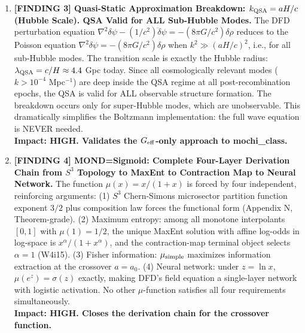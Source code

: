 \documentclass[11pt]{article}
\theoremstyle{definition}
\theoremstyle{remark}
\newcommand{\Geff}{G_{\rm eff}}
\newcommand{\dpsi}{\delta\psi}
\begin{document}
\begin{tcolorbox}[colback=blue!5!white, colframe=blue!60!black,
  title=\textbf{W4i19 TOP 5 FINDINGS --- RANKED BY IMPACT}]
\begin{enumerate}[nosep]
\item \textbf{[FINDING 3] Quasi-Static Approximation Breakdown:
  $k_{\rm QSA} = aH/c$ (Hubble Scale). QSA Valid for ALL Sub-Hubble Modes.}
  The DFD perturbation equation $\nabla^2\dpsi - (1/c^2)\ddot\dpsi
  = -(8\pi G/c^2)\delta\rho$ reduces to the Poisson equation
  $\nabla^2\dpsi = -(8\pi G/c^2)\delta\rho$ when $k^2 \gg (aH/c)^2$,
  i.e., for all sub-Hubble modes. The transition scale is exactly the
  Hubble radius: $\lambda_{\rm QSA} = c/H \approx 4.4$ Gpc today.
  Since all cosmologically relevant modes ($k > 10^{-4}$ Mpc$^{-1}$)
  are deep inside the QSA regime at all post-recombination epochs,
  the QSA is valid for ALL observable structure formation.
  The breakdown occurs only for super-Hubble modes, which are
  unobservable. This dramatically simplifies the Boltzmann
  implementation: the full wave equation is NEVER needed.\\
  \textbf{Impact: HIGH. Validates the $\Geff$-only approach to mochi\_class.}

\item \textbf{[FINDING 4] MOND=Sigmoid: Complete Four-Layer Derivation Chain
  from $S^3$ Topology to MaxEnt to Contraction Map to Neural Network.}
  The function $\mu(x) = x/(1+x)$ is forced by four independent,
  reinforcing arguments: (1) $S^3$ Chern-Simons microsector partition
  function exponent $3/2$ plus composition law forces the functional form
  (Appendix N, Theorem-grade). (2) Maximum entropy: among all monotone
  interpolants $[0,1]$ with $\mu(1)=1/2$, the unique MaxEnt solution
  with affine log-odds in log-space is $x^\alpha/(1+x^\alpha)$, and
  the contraction-map terminal object selects $\alpha = 1$ (W4i15).
  (3) Fisher information: $\mu_{\rm simple}$ maximizes information
  extraction at the crossover $a = a_0$. (4) Neural network: under
  $z = \ln x$, $\mu(e^z) = \sigma(z)$ exactly, making DFD's field
  equation a single-layer network with logistic activation. No other
  $\mu$-function satisfies all four requirements simultaneously.\\
  \textbf{Impact: HIGH. Closes the derivation chain for the crossover function.}


\end{enumerate}
\end{tcolorbox}
\end{document}
